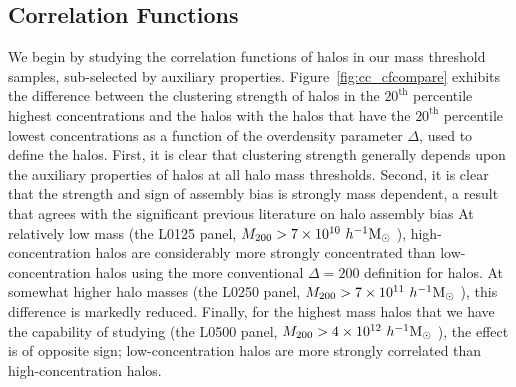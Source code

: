 \documentclass[usenatbib,usegraphicx,letterpaper]{mn2e}
\begin{document}
\subsection{Correlation Functions}
\label{sub:cfresults}

We begin by studying the correlation functions of halos in our mass threshold samples, sub-selected by auxiliary
properties. Figure~\ref{fig:cc_cfcompare} exhibits the difference between the clustering strength of halos in the
$20^{\mathrm{th}}$ percentile highest concentrations and the halos with the halos that have the
$20^{\mathrm{th}}$ percentile lowest concentrations as a function of the overdensity parameter $\Delta$, used to
define the halos. First, it is clear that clustering strength generally depends upon the auxiliary properties of
halos at all halo mass thresholds. Second, it is clear that the strength and sign of assembly bias is 
strongly mass dependent, a result that agrees with the significant previous literature on halo assembly bias
\citep{wechsler02, gao05, zentner07, wechsler06, harker06, croton07, dalal08, mao15, sunayama16} At relatively low mass (the L0125 panel, 
$M_{200} > 7 \times 10^{10} \ h^{-1}\mathrm{M}_{\odot}~$), high-concentration halos are considerably more strongly concentrated 
than low-concentration halos using the more 
conventional $\Delta = 200$ definition for halos. At somewhat higher halo masses (the L0250 panel, $M_{200} > 7
\times 10^{11} \ h^{-1}\mathrm{M}_{\odot}~$), this difference is markedly reduced. Finally, for the highest mass halos that we have
the capability of studying (the L0500 panel, $M_{200} > 4 \times 10^{12} \ h^{-1}\mathrm{M}_{\odot}~$), the effect is of opposite
sign; low-concentration halos are more strongly correlated than high-concentration halos.
\end{document}
